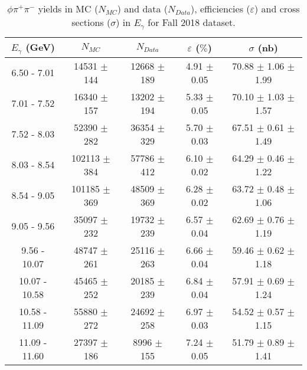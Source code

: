 \begin{center}
\begin{table}[H]
    \centering
    \caption{$\phi \pi^{+}\pi^{-}$ yields in MC ($N_{MC}$) and data ($N_{Data}$), efficiencies ($\varepsilon$) and cross sections ($\sigma$) in $E_{\gamma}$ for Fall 2018 dataset.}
    \label{tab.y2175.xsec_ul.phi2pi.4.1}
    \begin{tabular}{|c|c|c|c|c|}
    \hline
    $E_{\gamma}$ (GeV) & $N_{MC}$ & $N_{Data}$ & $\varepsilon$ ($\%$) & $\sigma$ (nb) \\ 
    \hline
    6.50 - 7.01 & 14531 $\pm$ 144 & 12668 $\pm$ 189 & 4.91 $\pm$ 0.05 & 70.88 $\pm$ 1.06 $\pm$ 1.99 \\ 
    7.01 - 7.52 & 16340 $\pm$ 157 & 13202 $\pm$ 194 & 5.33 $\pm$ 0.05 & 70.10 $\pm$ 1.03 $\pm$ 1.57 \\ 
    7.52 - 8.03 & 52390 $\pm$ 282 & 36354 $\pm$ 329 & 5.70 $\pm$ 0.03 & 67.51 $\pm$ 0.61 $\pm$ 1.49 \\ 
    8.03 - 8.54 & 102113 $\pm$ 384 & 57786 $\pm$ 412 & 6.10 $\pm$ 0.02 & 64.29 $\pm$ 0.46 $\pm$ 1.22 \\ 
    8.54 - 9.05 & 101185 $\pm$ 369 & 48509 $\pm$ 369 & 6.28 $\pm$ 0.02 & 63.72 $\pm$ 0.48 $\pm$ 1.06 \\ 
    9.05 - 9.56 & 35097 $\pm$ 232 & 19732 $\pm$ 239 & 6.57 $\pm$ 0.04 & 62.69 $\pm$ 0.76 $\pm$ 1.19 \\ 
    9.56 - 10.07 & 48747 $\pm$ 261 & 25116 $\pm$ 263 & 6.66 $\pm$ 0.04 & 59.46 $\pm$ 0.62 $\pm$ 1.18 \\ 
    10.07 - 10.58 & 45465 $\pm$ 252 & 20185 $\pm$ 239 & 6.84 $\pm$ 0.04 & 57.91 $\pm$ 0.69 $\pm$ 1.24 \\ 
    10.58 - 11.09 & 55880 $\pm$ 272 & 24692 $\pm$ 258 & 6.97 $\pm$ 0.03 & 54.52 $\pm$ 0.57 $\pm$ 1.15 \\ 
    11.09 - 11.60 & 27397 $\pm$ 186 & 8996 $\pm$ 155 & 7.24 $\pm$ 0.05 & 51.79 $\pm$ 0.89 $\pm$ 1.41 \\ 
   \hline
\end{tabular}
\end{table}
\null
\vfill
\end{center}

